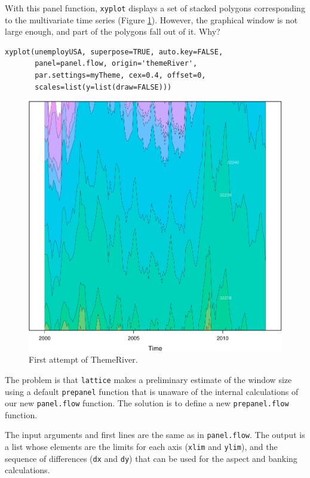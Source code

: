 With this panel function, \texttt{xyplot} displays a set of stacked
polygons corresponding to the multivariate time series (Figure
\ref{fig:themeRiverError}). However, the graphical window is not
large enough, and part of the polygons fall out of it. Why?

\lstset{language=R,numbers=none}
\begin{lstlisting}
xyplot(unemployUSA, superpose=TRUE, auto.key=FALSE,
       panel=panel.flow, origin='themeRiver',
       par.settings=myTheme, cex=0.4, offset=0,
       scales=list(y=list(draw=FALSE)))
\end{lstlisting}

\begin{figure}[htb]
\centering
\includegraphics[height=0.45\textheight]{figs/ThemeRiverError.pdf}
\caption{\label{fig:themeRiverError}First attempt of ThemeRiver.}
\end{figure}

The problem is that \texttt{lattice} makes a preliminary estimate of the
window size using a default \texttt{prepanel} function that is unaware of the
internal calculations of our new \texttt{panel.flow} function. The solution
is to define a new \texttt{prepanel.flow} function. 

The input arguments and first lines are the same as in
\texttt{panel.flow}. The output is a list whose elements are the limits for
each axis (\texttt{xlim} and \texttt{ylim}), and the sequence of differences (\texttt{dx}
and \texttt{dy}) that can be used for the aspect and banking
calculations. 

